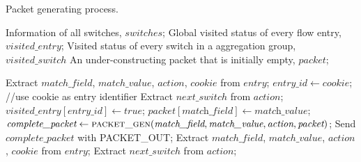 \begin {tcolorbox}[blanker,float=tbp,
grow to left by=1cm, grow to right by=1cm]
\begin{algorithm}[H]

  \caption{Packet generating process.}
  \begin{algorithmic}[1]
    \Require
      Information of all switches, $switches$;
      Global visited status of every flow entry, $visited\_entry$;
      Visited status of every switch in a aggregation group, $visited\_switch$
      An under-constructing packet that is initially empty, $packet$; 

          \State Extract $match\_field$, $match\_value$, $action$, $cookie$ from $entry$;
          \State $entry\_id \gets \textit{cookie}$; //use cookie as entry identifier
          \State 
          \State Extract $next\_switch$ from $action$;
            \State $\textit{visited\_entry}[\textit{entry\_id}] \gets true$;
            \State $packet[\textit{match\_field}] \gets \textit{match\_value}$;
            \State $\textit{complete\_packet} \gets \Call{packet\_gen}{\textit{match\_field}, \textit{match\_value}, \textit{action}, \textit{packet}}$;
            \State Send $\textit{complete\_packet}$ with PACKET\_OUT;
          \EndIf
      \EndFor
        \EndFor
    \EndFunction
    \State
        \State Extract $match\_field$, $match\_value$, $action$, $cookie$ from $entry$;
        \State Extract $next\_switch$ from $action$; 
  \end{algorithmic}
\end{algorithm}
\end{tcolorbox}

